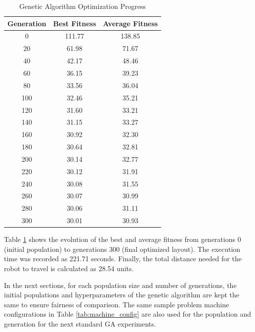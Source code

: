 \documentclass{article}
\begin{document}
\begin{table}[H]
\centering
\begin{tabular}{ccc}
\toprule
\textbf{Generation} & \textbf{Best Fitness} & \textbf{Average Fitness} \\
\midrule
0   & 111.77 & 138.85 \\
20  & 61.98  & 71.67  \\
40  & 42.17  & 48.46  \\
60  & 36.15  & 39.23  \\
80  & 33.56  & 36.04  \\
100 & 32.46  & 35.21  \\
120 & 31.60  & 33.21  \\
140 & 31.15  & 33.27  \\
160 & 30.92  & 32.30  \\
180 & 30.64  & 32.81  \\
200 & 30.14  & 32.77  \\
220 & 30.12  & 31.91  \\
240 & 30.08  & 31.55  \\
260 & 30.07  & 30.99  \\
280 & 30.06  & 31.11  \\
300 & 30.01  & 30.93  \\
\bottomrule
\end{tabular}
\caption{Genetic Algorithm Optimization Progress}
\label{tab:ga_progress}
\end{table}
Table \ref{tab:ga_progress} shows the evolution of the best and average fitness from generations 0 (initial population) to generations 300 (final optimized layout). The execution time was recorded as 221.71 seconds. Finally, the total distance needed for the robot to travel is calculated as 28.54 units.

In the next sections, for each population size and number of generations, the initial populations and hyperparameters of the genetic algorithm are kept the same to ensure fairness of comparison. The same sample problem machine configurations in Table \ref{tab:machine_config} are also used for the population and generation for the next standard GA experiments.
\end{document}

